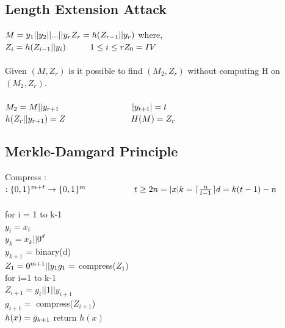 \documentclass[11pt]{article}
\begin{document}
\subsection*{Length Extension Attack } 
$ M = y_{1} || y_{2} || ... || y_{r} \\\\
Z_{r} = h(Z_{r-1} || y_{r}) \\ $
where, \\
$ Z_{i} = h(Z_{i-1} || y_{i}) \hspace*{1cm} 1 \leq i \leq r \\
Z_{0} = IV $ \\\\
Given $(M,Z_{r})$ is it possible to find $(M_{2},Z_{r})$ without computing H on $(M_{2},Z_{r})$. \\\\
$M_{2} = M || y_{r+1} \hspace*{3cm} |y_{t+1}| = t $\\
$h(Z_{r} || y_{r+1}) = Z   \hspace*{2.7cm} H(M) = Z_{r}$\\

\subsection*{Merkle-Damgard Principle}
Compress : 
$: \{0,1\}^{m+t} \rightarrow \{0,1\}^{m}  \hspace*{2cm} t \geq 2 \\\\
n = |x| \\
k = \lceil \frac{n}{t-1} \rceil \\
d = k(t-1) - n $ \\\\
for i = 1 to k-1 \\
$y_{i} = x_{i}$ \\
$y_{k} = x_{k} || 0^{d}$ \\
$y_{k+1}$ = binary(d) \\
$Z_{1} = 0^{m+1} || y_{1} \\
g_{1} = $ compress($Z_{1}$) \\
for i=1 to k-1 \\
\hspace*{0.5cm} $Z_{i+1} = g_{i} || 1 || y_{i+1}$ \\
\hspace*{0.5cm} $g_{i+1} = $ compress($Z_{i+1}$) \\
$h(x) = g_{k+1} \\$ 
return $h(x)$ \\
\end{document}
